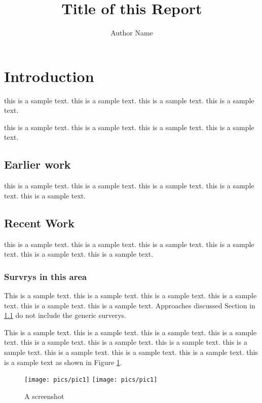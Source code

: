 \documentclass{article}
\title{Title of this Report}
\author {Author Name}
\begin{document}
\maketitle

\section{Introduction}

this is  a sample text.  this is  a sample text.  this is  a sample text.  this is  a sample text.  


this is  a sample text.
this is  a sample text.
this is  a sample text.
this is  a sample text.

\subsection{Earlier work} \label{ew}

this is  a sample text.
this is  a sample text.
this is  a sample text.
this is  a sample text.
this is  a sample text.

\subsection{Recent Work}

this is  a sample text.
this is  a sample text.
this is  a sample text.
this is  a sample text.
this is  a sample text.
this is  a sample text.

\subsubsection{Survrys in this area}

This is  a sample text.
this is  a sample text.
this is  a sample text.
this is  a sample text.
this is  a sample text.
this is  a sample text.
Approaches discussed Section in \ref{ew} do not include
the generic surverys.

This is  a sample text.
this is  a sample text.
this is  a sample text.
this is  a sample text.
this is  a sample text.
this is  a sample text.
this is  a sample text.
this is  a sample text.
this is  a sample text.
this is  a sample text.
this is  a sample text.
this is  a sample text as shown in Figure \ref{figsc}.

\begin{figure}
\texttt{[image: pics/pic1]}
\texttt{[image: pics/pic1]}
\caption{A screenshot}
\label{figsc}
\end{figure}
\end{document}
